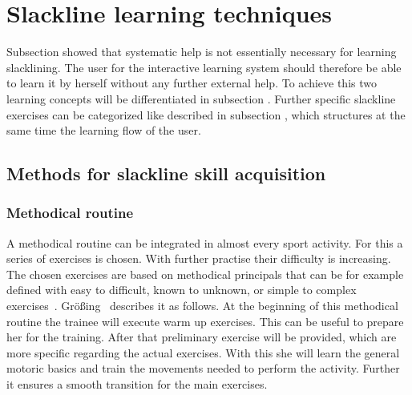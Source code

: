 \section{Slackline learning techniques}\label{3_3_learningTechniques}
Subsection \textit{} showed that systematic help is not essentially necessary for learning slacklining. The user for the interactive learning system should therefore be able to learn it by herself without any further external help. To achieve this two learning concepts will be differentiated in subsection \textit{}. Further specific slackline exercises can be categorized like described in subsection \textit{}, which structures at the same time the learning flow of the user.

\subsection{Methods for slackline skill acquisition}\label{3_3_1_learningConcepts}
\subsubsection{Methodical routine}
A methodical routine can be integrated in almost every sport activity. For this a series of exercises is chosen. With further practise their difficulty is increasing. The chosen exercises are based on methodical principals that can be for example defined with easy to difficult, known to unknown, or simple to complex exercises~\cite{Fetz1996-ml}. Größing~\cite{Groessing1997-sp} describes it as follows. At the beginning of this methodical routine the trainee will execute warm up exercises. This can be useful to prepare her for the training. After that preliminary exercise will be provided, which are more specific regarding the actual exercises. With this she will learn the general motoric basics and train the movements needed to perform the activity. Further it ensures a smooth transition for the main exercises.

